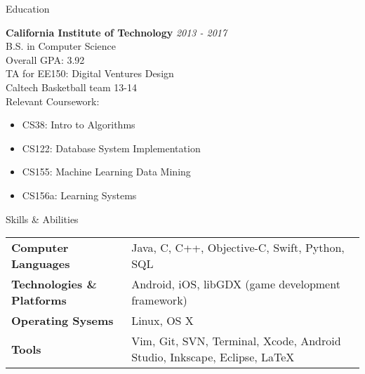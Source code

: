 \documentclass{resume} %
\begin{document}

\begin{rSection}{Education}

{\bf California Institute of Technology} \hfill {\em 2013 - 2017} \\
B.S. in Computer Science \smallskip \\
Overall GPA: 3.92 \\
TA for EE150: Digital Ventures Design \\
Caltech Basketball team 13-14 \smallskip \\
Relevant Coursework:
\vspace{-5.0mm}
\begin{minipage}{0.4\linewidth}
\begin{itemize}
\item{CS38: Intro to Algorithms}
\item{CS122: Database System Implementation}
\end{itemize}
\end{minipage}
\begin{minipage}{0.4\linewidth}
\begin{itemize}
\item{CS155: Machine Learning Data Mining}
\item{CS156a: Learning Systems}
\end{itemize}
\end{minipage}
\vspace{2mm}
\end{rSection}


\begin{rSection}{Skills \& Abilities}

\begin{tabularx}{\textwidth}{@{}lX}
    \bfseries{Computer Languages}   &  Java, C, C++, Objective-C, Swift, Python,
    SQL \\
    \bfseries{Technologies \& Platforms}   &  Android, iOS, libGDX (game development
    framework) \\
    \bfseries{Operating Sysems}   &  Linux, OS X \\
    \bfseries{Tools}   &  Vim, Git, SVN, Terminal, Xcode, Android Studio, Inkscape,
    Eclipse, \LaTeX \\
\end{tabularx}

\end{rSection}
\end{document}

